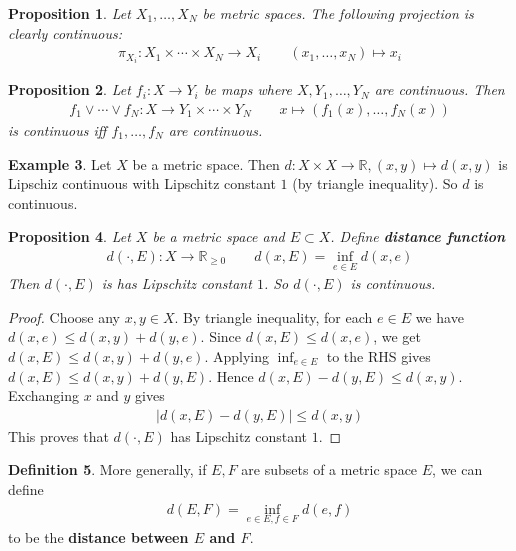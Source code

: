 \documentclass[12pt,b5paper,notitlepage]{article}
\theoremstyle{definition}
\newtheorem{df}{Definition}[section]
\newtheorem{eg}[df]{Example}
\theoremstyle{plain}
\newtheorem{pp}[df]{Proposition}
\newcommand{\Rbb}{\mathbb R}
\numberwithin{equation}{section}
\begin{document}
\begin{pp}
Let $X_1,\dots,X_N$ be metric spaces. The following  projection is clearly continuous:
\begin{gather*}
\pi_{X_i}:X_1\times\cdots\times X_N\rightarrow X_i\qquad(x_1,\dots,x_N)\mapsto x_i
\end{gather*}
\end{pp}

\begin{pp}
Let $f_i:X\rightarrow Y_i$ be maps where $X,Y_1,\dots,Y_N$ are continuous. Then 
\begin{gather*}
f_1\vee \cdots\vee f_N:X\rightarrow Y_1\times\cdots\times Y_N\qquad x\mapsto (f_1(x),\dots,f_N(x))
\end{gather*}
is continuous iff $f_1,\dots,f_N$ are continuous.
\end{pp}


\begin{eg}
Let $X$ be a metric space. Then $d:X\times X\rightarrow\Rbb,(x,y)\mapsto d(x,y)$ is Lipschiz continuous with Lipschitz constant $1$ (by triangle inequality). So $d$ is continuous.
\end{eg}

\begin{pp}\label{lb42}
Let $X$ be a metric space and $E\subset X$. Define \textbf{distance function}   
\begin{gather*}
d(\cdot,E):X\rightarrow\Rbb_{\geq0}\qquad
d(x,E)=\inf_{e\in E}d(x,e)
\end{gather*}
Then $d(\cdot,E)$ is has Lipschitz constant $1$. So $d(\cdot,E)$ is continuous.
\end{pp}


\begin{proof}
Choose any $x,y\in X$. By triangle inequality, for each $e\in E$ we have $d(x,e)\leq d(x,y)+d(y,e)$. Since $d(x,E)\leq d(x,e)$, we get  $d(x,E)\leq d(x,y)+d(y,e)$. Applying $\inf_{e\in E}$ to the RHS gives $d(x,E)\leq d(x,y)+d(y,E)$. Hence $d(x,E)-d(y,E)\leq d(x,y)$. Exchanging $x$ and $y$ gives
\begin{align}
\big|d(x,E)-d(y,E)\big|\leq d(x,y)
\end{align}
This proves that $d(\cdot,E)$ has Lipschitz constant $1$.
\end{proof}

\begin{df}
More generally, if $E,F$ are subsets of a metric space $E$, we can define 
\begin{align}
d(E,F)=\inf_{e\in E,f\in F}d(e,f)
\end{align}
to be the \textbf{distance between $E$ and $F$}.
\end{df}
\end{document}
